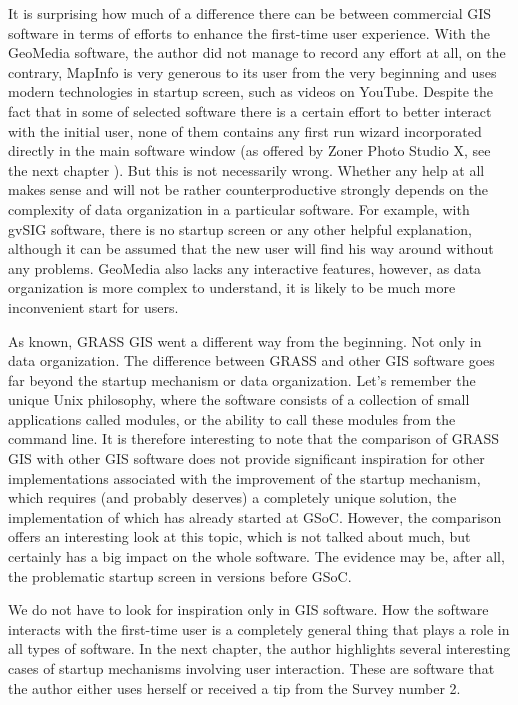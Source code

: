 \documentclass[a4paper,10pt,twoside]{article}
\begin{document}
It is surprising how much of a difference there can be between commercial GIS software in terms of efforts to enhance the first-time user experience. With the GeoMedia software, the author did not manage to record any effort at all, on the contrary, MapInfo is very generous to its user from the very beginning and uses modern technologies in startup screen, such as videos on YouTube. Despite the fact that in some of selected software there is a certain effort to better interact with the initial user, none of them contains any first run wizard incorporated directly in the main software window (as offered by Zoner Photo Studio X, see the next chapter \label{sec:other_software}). But this is not necessarily wrong. Whether any help at all makes sense and will not be rather counterproductive strongly depends on the complexity of data organization in a particular software. For example, with gvSIG software, there is no startup screen or any other helpful explanation, although it can be assumed that the new user will find his way around without any problems. GeoMedia also lacks any interactive features, however, as data organization is more complex to understand, it is likely to be much more inconvenient start for users.

As known, GRASS GIS went a different way from the beginning. Not only in data organization. The difference between GRASS and other GIS software goes far beyond the startup mechanism or data organization. Let's remember the unique Unix philosophy, where the software consists of a collection of small applications called modules, or the ability to call these modules from the command line. It is therefore interesting to note that the comparison of GRASS GIS with other GIS software does not provide significant inspiration for other implementations associated with the improvement of the startup mechanism, which requires (and probably deserves) a completely unique solution, the implementation of which has already started at GSoC. However, the comparison offers an interesting look at this topic, which is not talked about much, but certainly has a big impact on the whole software. The evidence may be, after all, the problematic startup screen in versions before GSoC. 

We do not have to look for inspiration only in GIS software. How the software interacts with the first-time user is a completely general thing that plays a role in all types of software. In the next chapter, the author highlights several interesting cases of startup mechanisms involving user interaction. These are software that the author either uses herself or received a tip from the Survey number 2.
\end{document}
